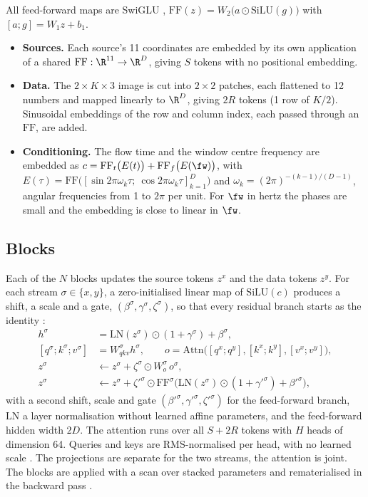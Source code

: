 All feed-forward maps are SwiGLU \citep{shazeer2020glu},
$\mathrm{FF}(z) = W_2\bigl(a\odot\mathrm{SiLU}(g)\bigr)$ with $[a;g] = W_1z + b_1$.
\begin{itemize}
  \item \textbf{Sources.} Each source's 11 coordinates are embedded by its own application of
        a shared $\mathrm{FF}: \R^{11}\to\R^D$, giving $S$ tokens with no positional embedding.
  \item \textbf{Data.} The $2\times K\times3$ image is cut into $2\times2$ patches, each
        flattened to 12 numbers and mapped linearly to $\R^D$, giving $2R$ tokens (1 row of
        $K/2$). Sinusoidal embeddings of the row and column index, each passed through an
        $\mathrm{FF}$, are added.
  \item \textbf{Conditioning.} The flow time and the window centre frequency are embedded as
        $c = \mathrm{FF}_t\bigl(E(t)\bigr) + \mathrm{FF}_f\bigl(E(\fw)\bigr)$, with
        $E(\tau) = \mathrm{FF}\bigl([\sin2\pi\omega_k\tau;\ \cos2\pi\omega_k\tau]_{k=1}^{D}\bigr)$
        and $\omega_k = (2\pi)^{-(k-1)/(D-1)}$, angular frequencies from 1 to $2\pi$ per
        unit. For $\fw$ in hertz the phases are small and the embedding is close to linear in
        $\fw$.
\end{itemize}

\subsection{Blocks}

Each of the $N$ blocks updates the source tokens $z^x$ and the data tokens $z^y$. For each
stream $\sigma\in\{x,y\}$, a zero-initialised linear map of $\mathrm{SiLU}(c)$ produces a shift,
a scale and a gate, $(\beta^\sigma,\gamma^\sigma,\zeta^\sigma)$, so that every residual branch
starts as the identity \citep{peebles2023scalable}:
\begin{align}
  h^\sigma &= \mathrm{LN}(z^\sigma)\odot(1+\gamma^\sigma) + \beta^\sigma, \nonumber\\
  [q^\sigma; k^\sigma; v^\sigma] &= W^\sigma_{qkv}h^\sigma,\qquad
  o = \mathrm{Attn}\bigl([q^x; q^y], [k^x; k^y], [v^x; v^y]\bigr), \nonumber\\
  z^\sigma &\leftarrow z^\sigma + \zeta^\sigma\odot W^\sigma_{o}\,o^\sigma, \nonumber\\
  z^\sigma &\leftarrow z^\sigma + \zeta'^\sigma\odot\mathrm{FF}^\sigma\bigl(\mathrm{LN}(z^\sigma)\odot(1+\gamma'^\sigma) + \beta'^\sigma\bigr),
\end{align}
with a second shift, scale and gate $(\beta'^\sigma,\gamma'^\sigma,\zeta'^\sigma)$ for the
feed-forward branch, $\mathrm{LN}$ a layer normalisation without learned affine parameters,
and the feed-forward hidden width $2D$. The attention runs over all $S+2R$ tokens with $H$
heads of dimension 64. Queries and keys are RMS-normalised per head, with no learned scale
\citep{henry2020query,dehghani2023scaling}. The projections are separate for the two streams,
the attention is joint. The blocks are applied with a scan over stacked parameters and
rematerialised in the backward pass \citep{chen2016training}.

